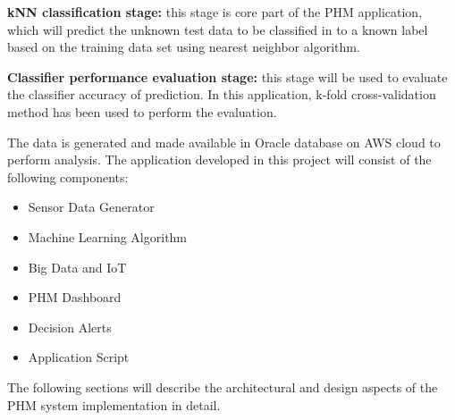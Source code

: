 \documentclass[sigconf]{acmart}
\begin{document}
\textbf{kNN classification stage:} this stage is core part of the PHM application, which will predict the unknown test data to be classified in to a known label based on the training data set using nearest neighbor algorithm.

\textbf{Classifier performance evaluation stage:} this stage will be used to evaluate the classifier accuracy of prediction. In this application, k-fold cross-validation method has been used to perform the evaluation.

The data is generated and made available in Oracle database on AWS cloud to perform analysis. The application developed in this project will consist of the following components:
\begin{itemize}
  \item Sensor Data Generator
  \item Machine Learning Algorithm
  \item Big Data and IoT
  \item PHM Dashboard
  \item Decision Alerts
  \item Application Script
 \end{itemize}

The following sections will describe the architectural and design aspects of the PHM system implementation in detail.
\end{document}
